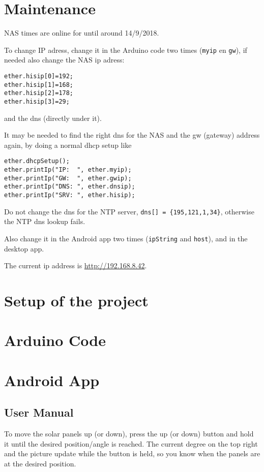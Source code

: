 \documentclass{article}
\begin{document}
	
	\tableofcontents
	\newpage
	
	\section{Maintenance}\label{sec:maintenance}
		NAS times are online for until around 14/9/2018.
		
		To change IP adress, change it in the Arduino code two times (\verb|myip| en \verb|gw|), if needed also change the NAS ip adress:
		\begin{lstlisting}
ether.hisip[0]=192;
ether.hisip[1]=168;
ether.hisip[2]=178;
ether.hisip[3]=29;
		\end{lstlisting}
		and the dns (directly under it).
		
		It may be needed to find the right dns for the NAS and the gw (gateway) address again, by doing a normal dhcp setup like
		\begin{lstlisting}
ether.dhcpSetup();
ether.printIp("IP:  ", ether.myip);
ether.printIp("GW:  ", ether.gwip);
ether.printIp("DNS: ", ether.dnsip);
ether.printIp("SRV: ", ether.hisip);
		\end{lstlisting}
		Do not change the dns for the NTP server, \verb|dns[] = {195,121,1,34}|, otherwise the NTP dns lookup fails.
		
		Also change it in the Android app two times (\verb|ipString| and \verb|host|), and in the desktop app.
		
		The current ip address is \url{http://192.168.8.42}.
	
	\section{Setup of the project}\label{sec:setupOfTheProject}
	

	\section{Arduino Code}\label{sec:arduinoCode}
	

	\section{Android App}\label{sec:androidApp}
		\subsection{User Manual}\label{subsec:userManual}
			To move the solar panels up (or down), press the up (or down) button and hold it until the desired position/angle is reached.
			The current degree on the top right and the picture update while the button is held, so you know when the panels are at the desired position.
			
\end{document}
